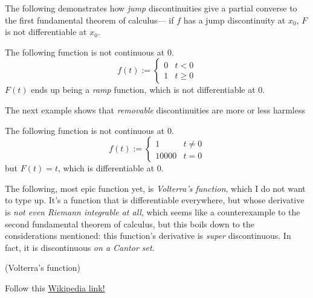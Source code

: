 \documentclass{article}
\begin{document}
The following demonstrates how \emph{jump} discontinuities give a partial converse to the first fundamental theorem of calculus--- if $f$ has a jump discontinuity at $x_0$, $F$ is not differentiable at $x_0$.
\begin{example} 
    The following function is not continuous at $0$.
    \[
        f(t) := \begin{cases}
            0 & t < 0 \\
            1 & t \geq 0 
        \end{cases}
    \]
    $F(t)$ ends up being a \emph{ramp} function, which is not differentiable at $0$.
\end{example}

The next example shows that \emph{removable} discontinuities are more or less harmless
\begin{example} 
    The following function is not continuous at $0$.
    \[
        f(t) := \begin{cases}
            1 & t \neq 0 \\
            10000 & t = 0 
        \end{cases}
    \]
    but $F(t) = t$, which is differentiable at $0$.
\end{example}

The following, most epic function yet, is \emph{Volterra's function}, which I do not want to type up. 
It's a function that is differentiable everywhere, but whose derivative is \emph{not even Riemann integrable at all}, which seems like a counterexample to the second fundamental theorem of calculus, but this boils down to the considerations mentioned: this function's derivative is \emph{super} discontinuous. 
In fact, it is discontinuous \emph{on a Cantor set}.
\begin{example} (Volterra's function)

    Follow this \href{https://en.wikipedia.org/wiki/Volterra\%27s_function}{Wikipedia link!}
\end{example}
\end{document}
